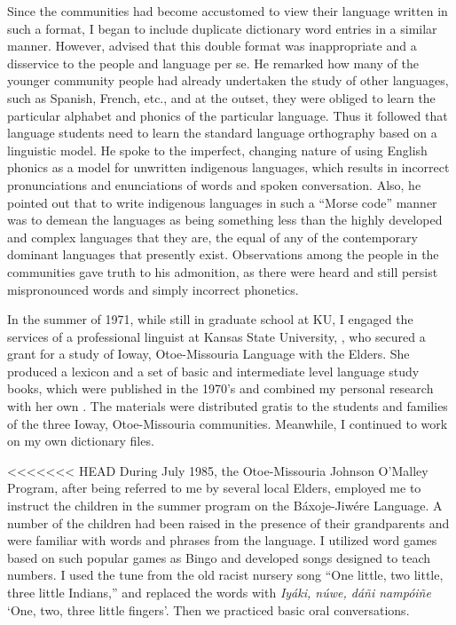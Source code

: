 \documentclass[output=paper]{LSP/langsci}
\begin{document}
Since the communities had become accustomed to view their language written in such a format, I began to include duplicate dictionary word entries in a similar manner. However,  advised that this double format was inappropriate and a disservice to the people and language per se. He remarked how many of the younger community people had already undertaken the study of other languages, such as Spanish, French, etc., and at the outset, they were obliged to learn the particular alphabet and phonics of the particular language. Thus it followed that language students need to learn the standard language orthography based on a linguistic model. He spoke to the imperfect, changing nature of using English phonics as a model for unwritten indigenous languages, which results in incorrect pronunciations and enunciations of words and spoken conversation. Also, he pointed out that to write indigenous languages in such a ``Morse code'' manner was to demean the languages as being something less than the highly developed and complex languages that they are, the equal of any of the contemporary dominant languages that presently exist. Observations among the people in the communities gave truth to his admonition, as there were heard and still persist mispronounced words and simply incorrect phonetics. 

In the summer of 1971, while still in graduate school at KU, I engaged the services of a professional linguist at Kansas State University, , who secured a grant for a study of Ioway, Otoe-Missouria Language with the Elders. She produced a lexicon and a set of basic and intermediate level language study books, which were published in the 1970's and combined my personal research with her own \citep{OtoeIowaWistrandRobinson1977, OtoeIowaWistrandRobinson1978}. The materials were distributed gratis to the students and families of the three Ioway, Otoe-Missouria communities. Meanwhile, I continued to work on my own dictionary files.  

<<<<<<< HEAD
During July 1985, the Otoe-Missouria Johnson O'Malley Program, after being referred to me by several local Elders, employed me to instruct the children in the summer program on the Báxoje-Jiw\'ere Language. A number of the children had been raised in the presence of their grandparents and were familiar with words and phrases from the language. I utilized word games based on such popular games as Bingo and developed songs designed to teach numbers. I used the tune from the old racist nursery song ``One little, two little, three little Indians,'' and replaced the words with \emph{Iyáki, n\'uwe, dáñi nampóiñe} `One, two, three little fingers'. Then we practiced basic oral conversations.  
\end{document}
